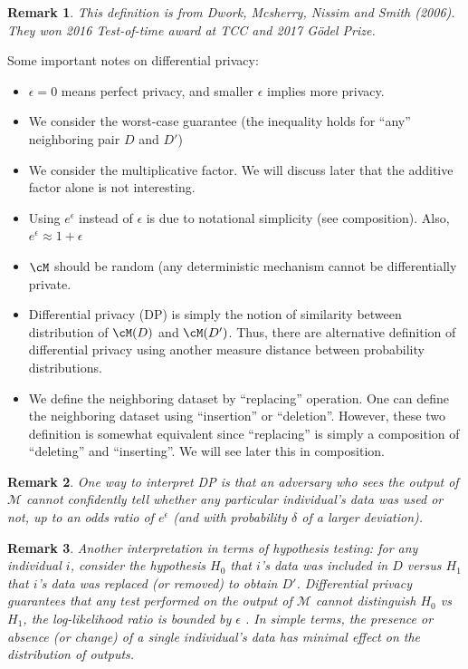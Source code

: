 \documentclass[11pt, a4paper]{article}
\newtheorem{remark}{Remark}
\begin{document}
\begin{remark}
    This definition is from Dwork, Mcsherry, Nissim and Smith (2006).
    They won 2016 Test-of-time award at TCC and 2017 G\"odel Prize.
\end{remark}

Some important notes on differential privacy:
\begin{itemize}
    \item $\epsilon=0$ means perfect privacy, and smaller $\epsilon$ implies more privacy.
    \item We consider the worst-case guarantee (the inequality holds for ``any'' neighboring pair $D$ and $D'$)
    \item We consider the multiplicative factor. We will discuss later that the additive factor alone is not interesting.
    \item Using $e^\epsilon$ instead of $\epsilon$ is due to notational simplicity (see composition). Also, $e^\epsilon\approx 1+\epsilon$
    \item $\cM$ should be random (any deterministic mechanism cannot be differentially private.
    \item Differential privacy (DP) is simply the notion of similarity between distribution of $\cM(D)$ and $\cM(D')$.
    Thus, there are alternative definition of differential privacy using another measure distance between probability distributions.
    \item We define the neighboring dataset by ``replacing'' operation.
    One can define the neighboring dataset using ``insertion'' or ``deletion''.
    However, these two definition is somewhat equivalent since ``replacing'' is simply a composition of ``deleting'' and ``inserting''.
    We will see later this in composition.
\end{itemize}

\begin{remark}
One way to interpret DP is that an adversary who sees the output of $\mathcal{M}$ cannot confidently tell 
whether any particular individual’s data was used or not, up to an odds ratio of $e^{\epsilon}$ (and with probability $\delta$ of a larger deviation).
\end{remark}
\begin{remark}
Another interpretation in terms of hypothesis testing: 
for any individual $i$, consider the hypothesis $H_0$ that $i$'s data was included in $D$ versus $H_1$ that $i$'s data was replaced (or removed) to obtain $D'$.
Differential privacy guarantees that any test performed on the output of $\mathcal{M}$ cannot distinguish $H_0$ vs $H_1$,
the log-likelihood ratio is bounded by $\epsilon$ \cite{Wasserman2010}. 
In simple terms, the presence or absence (or change) of a single individual's data has minimal effect on the distribution of outputs.\\
\end{remark}
\end{document}
